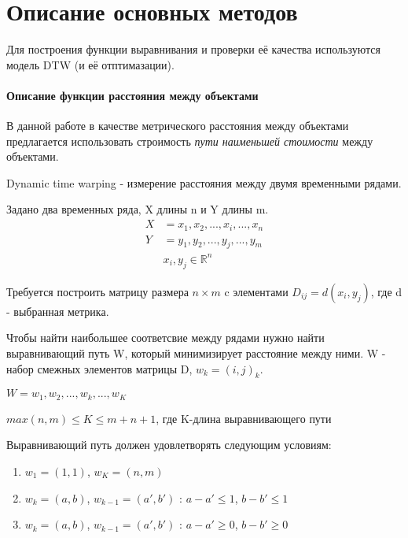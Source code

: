 \documentclass[12pt,twoside]{article}
\begin{document}
    \section{Описание основных методов}
        
        Для построения функции выравнивания и проверки её качества используются модель DTW (и её отптимазации).
            
    \paragraph{Описание функции расстояния между объектами}

        В данной работе в качестве метрического расстояния между объектами предлагается использовать строимость \textit{пути наименьшей стоимости} между объектами.
            
        Dynamic time warping - измерение расстояния между двумя временными рядами.
            
        Задано два временных ряда, X длины n и Y длины m.
            \begin{align*}
                X &= x_1,x_2, ..., x_i, ..., x_n \\
                Y &= y_1,y_2, ..., y_j, ..., y_m \\
                & x_i, y_j \in \mathbb{R}^n
            \end{align*}

        Требуется построить матрицу размера $n\times m$ c элементами $D_{ij}=d(x_i, y_j)$, где d - выбранная метрика.
            
        Чтобы найти наибольшее соответсвие между рядами нужно найти выравнивающий путь W, который минимизирует расстояние между ними.
        W - набор смежных элементов матрицы D, $w_k = (i, j)_k$.
            
            $W = w_1,w_2, ..., w_k, ..., w_K $

            $max(n, m)\leq K \leq m+n+1$, где K-длина выравнивающего пути
            
        Выравнивающий путь должен удовлетворять следующим условиям:
            \begin{enumerate}
                \item $w_1=(1,1)$, $w_K=(n, m)$
                \item $w_k = (a, b)$, $w_{k-1}=(a', b')$ : $a-a' \leq 1$, $b-b' \leq 1$ 
                \item $w_k = (a, b)$, $w_{k-1}=(a', b')$ : $a-a' \geq 0$, $b-b'\geq 0$
            \end{enumerate}
\end{document}
